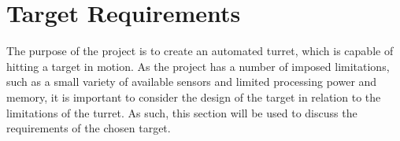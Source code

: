 \section{Target Requirements}\label{TargetReq}
The purpose of the project is to create an automated turret, which is capable of
hitting a target in motion. As the project has a number of imposed limitations,
such as a small variety of available sensors and limited processing power and
memory, it is important to consider the design of the target in relation to the
limitations of the turret. As such, this section will be used to discuss the
requirements of the chosen target.
